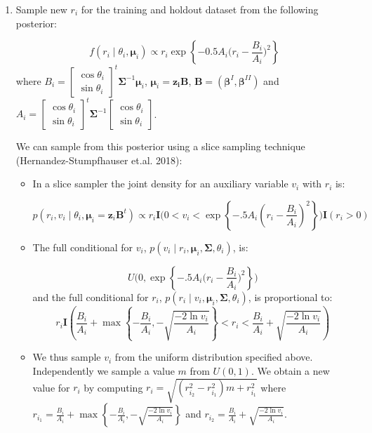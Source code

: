 \documentclass[11pt,]{article}
\begin{document}
\begin{appendices}
\begin{enumerate}
\item Sample new $r_i$ for the training and holdout dataset from the following posterior:

$$f(r_i \mid \theta_i, \boldsymbol{\mu}_i) \propto r_i \exp{\left\{-0.5A_i\bigg(r_i-\frac{B_i}{A_i}\bigg)^2\right\}}$$ 
where $B_i = \begin{bmatrix} \cos \theta_i \\ \sin \theta_i\end{bmatrix}^t\boldsymbol{\Sigma}^{-1}\boldsymbol{\mu}_i$, $\boldsymbol{\mu}_i = \boldsymbol{z_i}\boldsymbol{B}$, $\boldsymbol{B} = (\boldsymbol{\beta}^{I}, \boldsymbol{\beta}^{II})$ and $A_i = \begin{bmatrix} \cos \theta_i \\ \sin \theta_i\end{bmatrix}^t\boldsymbol{\Sigma}^{-1}\begin{bmatrix} \cos \theta_i \\ \sin \theta_i\end{bmatrix}$.

We can sample from this posterior using a slice sampling technique (Hernandez-Stumpfhauser et.al. 2018):

\begin{itemize}
\item In a slice sampler the joint density for an auxiliary variable $v_{i}$ with $r_{i}$ is:

$$p(r_{i}, v_{i}\mid \theta_{i}, \boldsymbol{\mu}_{i}=\boldsymbol{z}_{i}\boldsymbol{B}^{t}) \propto r_{i} \textbf{I}\bigg(0 < v_i < \exp\left\{ -.5 A_i(r_{i} - \frac{B_i}{A_i})^2\right\}\bigg)\textbf{I}(r_i > 0)$$

\item The full conditional for $v_{i}$, $p(v_{i} \mid r_{i},\boldsymbol{\mu}_{i}, \boldsymbol{\Sigma}, \theta_{i})$, is:

$$U\Bigg(0, \exp\left\{-.5A_i\bigg(r_i -  \frac{B_{i}}{A_i}\bigg)^2\right\}\Bigg)$$
and the full conditional for $r_i$, $p(r_{i} \mid v_{i},\boldsymbol{\mu}_{i}, \boldsymbol{\Sigma}, \theta_{i})$, is proportional to:
$$r_{i} \textbf{I}\left(\frac{B_i}{A_i} + \max\left\{-\frac{B_i}{A_i}, -\sqrt{\frac{-2\ln v_{i}}{A_i}}\right\} < r_{i} < \frac{B_i}{A_i} + \sqrt{\frac{-2\ln v_{i}}{A_i}}\right)$$
\item We thus sample $v_{i}$ from the uniform distribution specified above. Independently we sample a value $m$ from $U(0,1)$. We obtain a new value for $r_{i}$ by computing $r_{i} = \sqrt{(r_{i_{2}}^{2}-r_{i_{1}}^{2})m + r_{i_{1}}^{2}}$ where $r_{i_{1}}=\frac{B_i}{A_i} +\max\left\{-\frac{B_i}{A_i}, -\sqrt{\frac{-2\ln v_{i}}{A_i}}\right\}$ and $ r_{i_{2}}= \frac{B_i}{A_i} + \sqrt{\frac{-2\ln v_{i}}{A_i}}$.


\end{itemize}
\end{enumerate}
\end{appendices}
\end{document}
